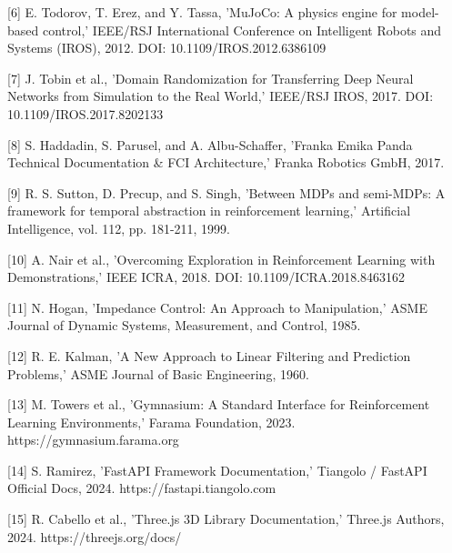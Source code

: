 [6] E. Todorov, T. Erez, and Y. Tassa, 'MuJoCo: A physics engine for model-based control,' IEEE/RSJ International Conference on Intelligent Robots and Systems (IROS), 2012. DOI: 10.1109/IROS.2012.6386109

[7] J. Tobin et al., 'Domain Randomization for Transferring Deep Neural Networks from Simulation to the Real World,' IEEE/RSJ IROS, 2017. DOI: 10.1109/IROS.2017.8202133

[8] S. Haddadin, S. Parusel, and A. Albu-Schaffer, 'Franka Emika Panda Technical Documentation \& FCI Architecture,' Franka Robotics GmbH, 2017.

[9] R. S. Sutton, D. Precup, and S. Singh, 'Between MDPs and semi-MDPs: A framework for temporal abstraction in reinforcement learning,' Artificial Intelligence, vol. 112, pp. 181-211, 1999.

[10] A. Nair et al., 'Overcoming Exploration in Reinforcement Learning with Demonstrations,' IEEE ICRA, 2018. DOI: 10.1109/ICRA.2018.8463162

[11] N. Hogan, 'Impedance Control: An Approach to Manipulation,' ASME Journal of Dynamic Systems, Measurement, and Control, 1985.

[12] R. E. Kalman, 'A New Approach to Linear Filtering and Prediction Problems,' ASME Journal of Basic Engineering, 1960.

[13] M. Towers et al., 'Gymnasium: A Standard Interface for Reinforcement Learning Environments,' Farama Foundation, 2023. https://gymnasium.farama.org

[14] S. Ramirez, 'FastAPI Framework Documentation,' Tiangolo / FastAPI Official Docs, 2024. https://fastapi.tiangolo.com

[15] R. Cabello et al., 'Three.js 3D Library Documentation,' Three.js Authors, 2024. https://threejs.org/docs/

